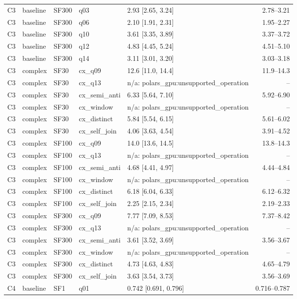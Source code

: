 \begin{longtable}{lllllr}
C3 & baseline & SF300 & q03 & 2.93 [2.65, 3.24] & 2.78--3.21 \\
C3 & baseline & SF300 & q06 & 2.10 [1.91, 2.31] & 1.95--2.27 \\
C3 & baseline & SF300 & q10 & 3.61 [3.35, 3.89] & 3.37--3.72 \\
C3 & baseline & SF300 & q12 & 4.83 [4.45, 5.24] & 4.51--5.10 \\
C3 & baseline & SF300 & q14 & 3.11 [3.01, 3.20] & 3.03--3.18 \\
C3 & complex & SF30 & cx\_q09 & 12.6 [11.0, 14.4] & 11.9--14.3 \\
C3 & complex & SF30 & cx\_q13 & n/a: polars\_gpu:unsupported\_operation & -- \\
C3 & complex & SF30 & cx\_semi\_anti & 6.33 [5.64, 7.10] & 5.92--6.90 \\
C3 & complex & SF30 & cx\_window & n/a: polars\_gpu:unsupported\_operation & -- \\
C3 & complex & SF30 & cx\_distinct & 5.84 [5.54, 6.15] & 5.61--6.02 \\
C3 & complex & SF30 & cx\_self\_join & 4.06 [3.63, 4.54] & 3.91--4.52 \\
C3 & complex & SF100 & cx\_q09 & 14.0 [13.6, 14.5] & 13.8--14.3 \\
C3 & complex & SF100 & cx\_q13 & n/a: polars\_gpu:unsupported\_operation & -- \\
C3 & complex & SF100 & cx\_semi\_anti & 4.68 [4.41, 4.97] & 4.44--4.84 \\
C3 & complex & SF100 & cx\_window & n/a: polars\_gpu:unsupported\_operation & -- \\
C3 & complex & SF100 & cx\_distinct & 6.18 [6.04, 6.33] & 6.12--6.32 \\
C3 & complex & SF100 & cx\_self\_join & 2.25 [2.15, 2.34] & 2.19--2.33 \\
C3 & complex & SF300 & cx\_q09 & 7.77 [7.09, 8.53] & 7.37--8.42 \\
C3 & complex & SF300 & cx\_q13 & n/a: polars\_gpu:unsupported\_operation & -- \\
C3 & complex & SF300 & cx\_semi\_anti & 3.61 [3.52, 3.69] & 3.56--3.67 \\
C3 & complex & SF300 & cx\_window & n/a: polars\_gpu:unsupported\_operation & -- \\
C3 & complex & SF300 & cx\_distinct & 4.73 [4.63, 4.83] & 4.65--4.79 \\
C3 & complex & SF300 & cx\_self\_join & 3.63 [3.54, 3.73] & 3.56--3.69 \\
C4 & baseline & SF1 & q01 & 0.742 [0.691, 0.796] & 0.716--0.787 \\

\end{longtable}
